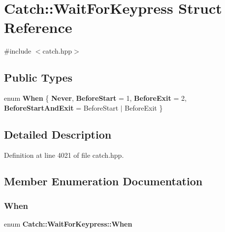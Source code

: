 \section{Catch\+::Wait\+For\+Keypress Struct Reference}
\label{struct_catch_1_1_wait_for_keypress}


{\ttfamily \#include $<$catch.\+hpp$>$}

\subsection*{Public Types}
\begin{DoxyCompactItemize}
\item 
enum \textbf{ When} \{ \textbf{ Never}, 
\textbf{ Before\+Start} = 1, 
\textbf{ Before\+Exit} = 2, 
\textbf{ Before\+Start\+And\+Exit} = Before\+Start $\vert$ Before\+Exit
 \}
\end{DoxyCompactItemize}


\subsection{Detailed Description}


Definition at line 4021 of file catch.\+hpp.



\subsection{Member Enumeration Documentation}
\mbox{\label{struct_catch_1_1_wait_for_keypress_a2e8c4369d0a605d64e3e83b5af3399ba}} 
\subsubsection{When}
{\footnotesize\ttfamily enum \textbf{ Catch\+::\+Wait\+For\+Keypress\+::\+When}}

